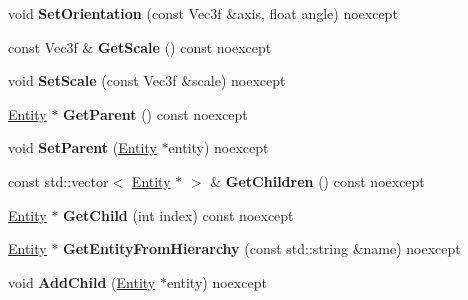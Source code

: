 \begin{DoxyCompactItemize}
\item 
\mbox{\label{class_blade_1_1_entity_a101a91226ccb27bb754c14d8850c3cb9}} 
void {\bfseries Set\+Orientation} (const Vec3f \&axis, float angle) noexcept
\item 
\mbox{\label{class_blade_1_1_entity_a37223f2655e93abd22c50e247c668f70}} 
const Vec3f \& {\bfseries Get\+Scale} () const noexcept
\item 
\mbox{\label{class_blade_1_1_entity_a7958a603c4120cf627f668dd1a1c12e4}} 
void {\bfseries Set\+Scale} (const Vec3f \&scale) noexcept
\item 
\mbox{\label{class_blade_1_1_entity_ae617eb77e89f3f87b0705cbb01603c03}} 
\hyperlink{class_blade_1_1_entity}{Entity} $\ast$ {\bfseries Get\+Parent} () const noexcept
\item 
\mbox{\label{class_blade_1_1_entity_a1ad0c4309437aa33dd08cd6f713c8d77}} 
void {\bfseries Set\+Parent} (\hyperlink{class_blade_1_1_entity}{Entity} $\ast$entity) noexcept
\item 
\mbox{\label{class_blade_1_1_entity_a4e16c43896a8d8899ad69799851c734e}} 
const std\+::vector$<$ \hyperlink{class_blade_1_1_entity}{Entity} $\ast$ $>$ \& {\bfseries Get\+Children} () const noexcept
\item 
\mbox{\label{class_blade_1_1_entity_acb8d257cd8c984511d9a3ed86968678c}} 
\hyperlink{class_blade_1_1_entity}{Entity} $\ast$ {\bfseries Get\+Child} (int index) const noexcept
\item 
\mbox{\label{class_blade_1_1_entity_a2946223b0c7dfef47a60dcf3b440a4bc}} 
\hyperlink{class_blade_1_1_entity}{Entity} $\ast$ {\bfseries Get\+Entity\+From\+Hierarchy} (const std\+::string \&name) noexcept
\item 
\mbox{\label{class_blade_1_1_entity_a528b991cf5ab76dfd6b05cd18869b9d5}} 
void {\bfseries Add\+Child} (\hyperlink{class_blade_1_1_entity}{Entity} $\ast$entity) noexcept
\item 
\mbox{\label{class_blade_1_1_entity_a4f1211f066ed924315b830355361c900}} 

\end{DoxyCompactItemize}
